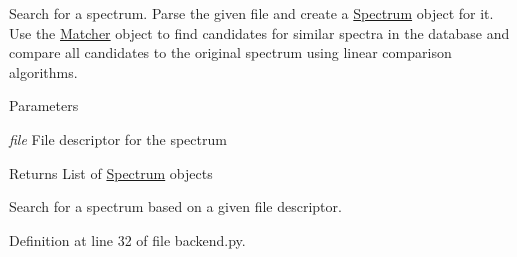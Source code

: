 Search for a spectrum. Parse the given file and create a \hyperlink{classbackend_1_1_spectrum}{Spectrum} object for it. Use the \hyperlink{classbackend_1_1_matcher}{Matcher} object to find candidates for similar spectra in the database and compare all candidates to the original spectrum using linear comparison algorithms.


\begin{DoxyParams}{Parameters}
\item[{\em file}]File descriptor for the spectrum \end{DoxyParams}
\begin{DoxyReturn}{Returns}
List of \hyperlink{classbackend_1_1_spectrum}{Spectrum} objects\begin{DoxyVerb}Search for a spectrum based on a given file descriptor.\end{DoxyVerb}
 
\end{DoxyReturn}


Definition at line 32 of file backend.py.